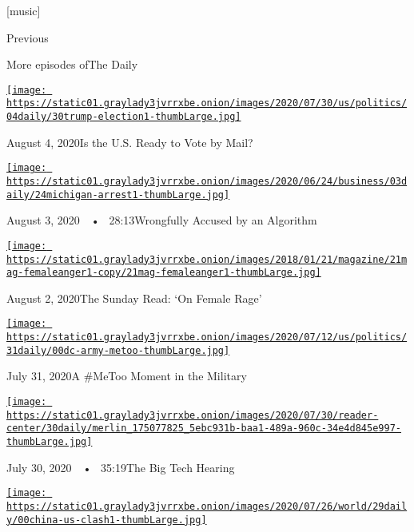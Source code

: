 {[}music{]}

Previous

More episodes ofThe Daily

\href{https://www.nytimes3xbfgragh.onion/2020/08/04/podcasts/the-daily/mail-in-voting-president-trump.html?action=click\&module=audio-series-bar\&region=header\&pgtype=Article}{\texttt{[image: https://static01.graylady3jvrrxbe.onion/images/2020/07/30/us/politics/04daily/30trump-election1-thumbLarge.jpg]}}

August 4, 2020Is the U.S. Ready to Vote by Mail?

\href{https://www.nytimes3xbfgragh.onion/2020/08/03/podcasts/the-daily/algorithmic-justice-racism.html?action=click\&module=audio-series-bar\&region=header\&pgtype=Article}{\texttt{[image: https://static01.graylady3jvrrxbe.onion/images/2020/06/24/business/03daily/24michigan-arrest1-thumbLarge.jpg]}}

August 3, 2020~~•~ 28:13Wrongfully Accused by an Algorithm

\href{https://www.nytimes3xbfgragh.onion/2020/08/02/podcasts/the-daily/on-female-rage.html?action=click\&module=audio-series-bar\&region=header\&pgtype=Article}{\texttt{[image: https://static01.graylady3jvrrxbe.onion/images/2018/01/21/magazine/21mag-femaleanger1-copy/21mag-femaleanger1-thumbLarge.jpg]}}

August 2, 2020The Sunday Read: `On Female Rage'

\href{https://www.nytimes3xbfgragh.onion/2020/07/31/podcasts/the-daily/vanessa-guillen-military-metoo.html?action=click\&module=audio-series-bar\&region=header\&pgtype=Article}{\texttt{[image: https://static01.graylady3jvrrxbe.onion/images/2020/07/12/us/politics/31daily/00dc-army-metoo-thumbLarge.jpg]}}

July 31, 2020A \#MeToo Moment in the Military

\href{https://www.nytimes3xbfgragh.onion/2020/07/30/podcasts/the-daily/congress-facebook-amazon-google-apple.html?action=click\&module=audio-series-bar\&region=header\&pgtype=Article}{\texttt{[image: https://static01.graylady3jvrrxbe.onion/images/2020/07/30/reader-center/30daily/merlin\_175077825\_5ebc931b-baa1-489a-960c-34e4d845e997-thumbLarge.jpg]}}

July 30, 2020~~•~ 35:19The Big Tech Hearing

\href{https://www.nytimes3xbfgragh.onion/2020/07/29/podcasts/the-daily/china-trump-foreign-policy.html?action=click\&module=audio-series-bar\&region=header\&pgtype=Article}{\texttt{[image: https://static01.graylady3jvrrxbe.onion/images/2020/07/26/world/29daily/00china-us-clash1-thumbLarge.jpg]}}

